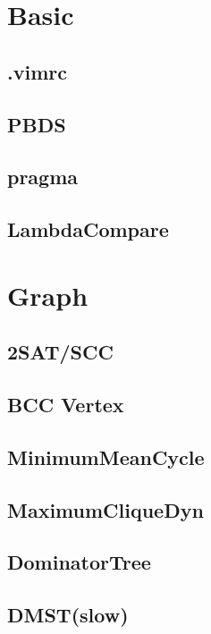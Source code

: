 \section{Basic}
	\subsection{.vimrc}
	
	\subsection{PBDS}
	
	\subsection{pragma}
	
	\subsection{LambdaCompare}
	
\section{Graph}
	\subsection{2SAT/SCC}
	
	\subsection{BCC Vertex}
	
	\subsection{MinimumMeanCycle}
	
	\subsection{MaximumCliqueDyn}
	
	\subsection{DominatorTree}
	
	\subsection{DMST(slow)}
	

